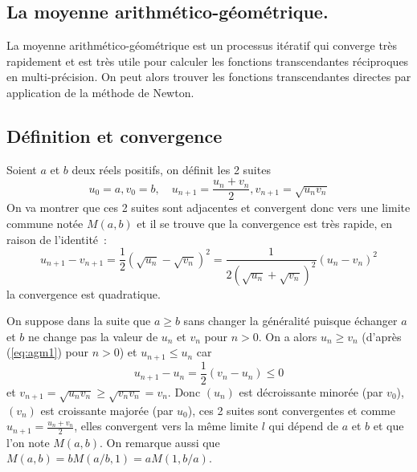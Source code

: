 \documentclass[a4paper,11pt]{article}
\begin{document}
\begin{giacjshere}
\section{La moyenne arithm\'etico-g\'eom\'etrique.}
\label{sec:agm}
La moyenne arithm\'etico-g\'eom\'etrique est un processus it\'eratif
qui converge tr\`es rapidement et est tr\`es utile pour calculer
les fonctions transcendantes r\'eciproques en multi-pr\'ecision. 
On peut alors trouver les fonctions transcendantes directes
par application de la m\'ethode de Newton.

\subsection{D\'efinition et convergence}
Soient $a$ et $b$ deux r\'eels positifs,
on d\'efinit les 2 suites 
\begin{equation} \label{eq:agm}
 u_0=a, v_0=b, \quad u_{n+1}=\frac{u_n+v_n}{2}, v_{n+1}=\sqrt{u_nv_n} 
\end{equation}
On va montrer que ces 2 suites sont adjacentes et convergent donc vers
une limite commune not\'ee $M(a,b)$ et il se trouve que la convergence
est tr\`es rapide, en raison de l'identit\'e~:
\begin{equation} \label{eq:agm1}
u_{n+1}-v_{n+1}=\frac{1}{2}(\sqrt{u_n}-\sqrt{v_n})^2
=\frac{1}{2(\sqrt{u_n}+\sqrt{v_n})^2}(u_n-v_n)^2
\end{equation}
la convergence est quadratique.

On suppose dans la suite que $a\geq b$ sans changer la généralité puisque échanger $a$ et $b$
ne change pas la valeur de $u_n$ et $v_n$ pour $n>0$. On a alors $u_n \geq v_n$ 
(d'après (\ref{eq:agm1}) pour $n>0$) et $u_{n+1} \leq u_n$ car
\[ u_{n+1}-u_n=\frac{1}{2}(v_n-u_{n}) \leq 0\]
et $v_{n+1}=\sqrt{u_nv_n} \geq \sqrt{v_nv_n}=v_n$. Donc $(u_n)$ est décroissante 
minorée (par $v_0$), $(v_n)$ est croissante majorée (par $u_0$), ces 2 suites sont 
convergentes et comme $u_{n+1}=\frac{u_n+v_n}{2}$, elles convergent vers la même limite 
$l$ qui d\'epend de $a$ et $b$ et que l'on note $M(a,b)$.
On remarque aussi que $M(a,b)=bM(a/b,1)=aM(1,b/a)$. 


\end{giacjshere}
\end{document}
